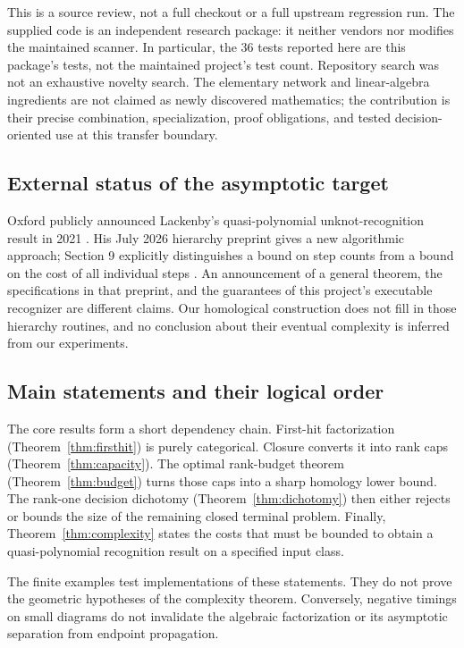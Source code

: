 \documentclass[11pt,letterpaper]{article}
\theoremstyle{definition}\newtheorem{definition}[theorem]{Definition}
\theoremstyle{remark}\newtheorem{remark}[theorem]{Remark}
\begin{document}
This is a source review, not a full checkout or a full upstream regression
run. The supplied code is an independent research package: it neither vendors
nor modifies the maintained scanner. In particular, the 36 tests reported
here are this package's tests, not the maintained project's test count.
Repository search was not an exhaustive novelty search. The elementary
network and linear-algebra ingredients are not claimed as newly discovered
mathematics; the contribution is their precise combination, specialization,
proof obligations, and tested decision-oriented use at this transfer boundary.

\subsection{External status of the asymptotic target}
Oxford publicly announced Lackenby's quasi-polynomial unknot-recognition
result in 2021 \cite{oxford2021}. His July 2026 hierarchy preprint gives a
new algorithmic approach; Section 9 explicitly distinguishes a bound on step
counts from a bound on the cost of all individual steps \cite{lackenby2026}.
An announcement of a general theorem, the specifications in that preprint,
and the guarantees of this project's executable recognizer are different
claims. Our homological construction does not fill in those hierarchy
routines, and no conclusion about their eventual complexity is inferred
from our experiments.

\subsection{Main statements and their logical order}
The core results form a short dependency chain. First-hit factorization
(Theorem~\ref{thm:firsthit}) is purely categorical. Closure converts it into
rank caps (Theorem~\ref{thm:capacity}). The optimal rank-budget theorem
(Theorem~\ref{thm:budget}) turns those caps into a sharp homology lower bound.
The rank-one decision dichotomy (Theorem~\ref{thm:dichotomy}) then either
rejects or bounds the size of the remaining closed terminal problem.
Finally, Theorem~\ref{thm:complexity} states the costs that must be bounded
to obtain a quasi-polynomial recognition result on a specified input class.

The finite examples test implementations of these statements. They do not
prove the geometric hypotheses of the complexity theorem. Conversely,
negative timings on small diagrams do not invalidate the algebraic
factorization or its asymptotic separation from endpoint propagation.
\end{document}
